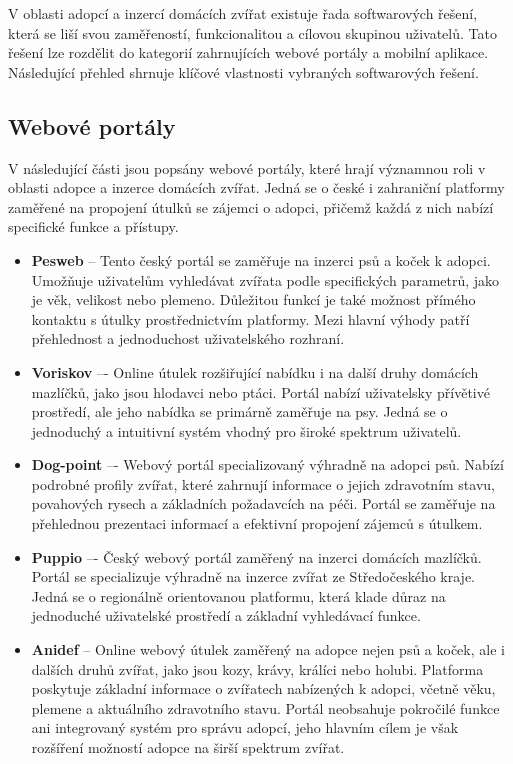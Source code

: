 \documentclass[12pt,a4paper]{report}
\begin{document}
V oblasti adopcí a inzercí domácích zvířat existuje řada softwarových řešení, která se liší svou zaměřeností, funkcionalitou a cílovou skupinou uživatelů. Tato řešení lze rozdělit do kategorií zahrnujících webové portály a mobilní aplikace. Následující přehled shrnuje klíčové vlastnosti vybraných softwarových řešení.

\subsection{Webové portály}

V následující části jsou popsány webové portály, které hrají významnou roli v oblasti adopce a inzerce domácích zvířat. Jedná se o české i zahraniční platformy zaměřené na propojení útulků se zájemci o adopci, přičemž každá z nich nabízí specifické funkce a přístupy.

\begin{itemize}
    \item \textbf{Pesweb} – Tento český portál se zaměřuje na inzerci psů a koček k adopci. Umožňuje uživatelům vyhledávat zvířata podle specifických parametrů, jako je věk, velikost nebo plemeno. Důležitou funkcí je také možnost přímého kontaktu s útulky prostřednictvím platformy. Mezi hlavní výhody patří přehlednost a jednoduchost uživatelského rozhraní.

    \item \textbf{Voriskov} –- Online útulek rozšiřující nabídku i na další druhy domácích mazlíčků, jako jsou hlodavci nebo ptáci. Portál nabízí uživatelsky přívětivé prostředí, ale jeho nabídka se primárně zaměřuje na psy. Jedná se o jednoduchý a intuitivní systém vhodný pro široké spektrum uživatelů.

    \item \textbf{Dog-point} –- Webový portál specializovaný výhradně na adopci psů. Nabízí podrobné profily zvířat, které zahrnují informace o jejich zdravotním stavu, povahových rysech a základních požadavcích na péči. Portál se zaměřuje na přehlednou prezentaci informací a efektivní propojení zájemců s útulkem.

    \item \textbf{Puppio} –- Český webový portál zaměřený na inzerci domácích mazlíčků. Portál se specializuje výhradně na inzerce zvířat ze Středočeského kraje. Jedná se o regionálně orientovanou platformu, která klade důraz na jednoduché uživatelské prostředí a základní vyhledávací funkce.

    \item \textbf{Anidef} – Online webový útulek zaměřený na adopce nejen psů a koček, ale i dalších druhů zvířat, jako jsou kozy, krávy, králíci nebo holubi. Platforma poskytuje základní informace o zvířatech nabízených k adopci, včetně věku, plemene a aktuálního zdravotního stavu. Portál neobsahuje pokročilé funkce ani integrovaný systém pro správu adopcí, jeho hlavním cílem je však rozšíření možností adopce na širší spektrum zvířat.
\end{itemize}
\end{document}
